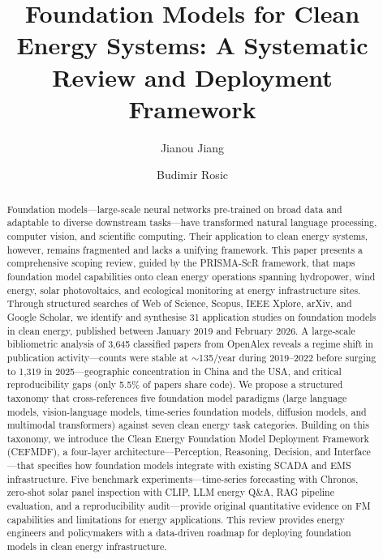 \documentclass[preprint,12pt]{elsarticle}
\begin{document}
\begin{frontmatter}
\title{Foundation Models for Clean Energy Systems: A Systematic Review and Deployment Framework}

\author[ox]{Jianou Jiang}
\author[ox2]{Budimir Rosic}



\begin{abstract}
Foundation models---large-scale neural networks pre-trained on broad data and adaptable to diverse downstream tasks---have transformed natural language processing, computer vision, and scientific computing. Their application to clean energy systems, however, remains fragmented and lacks a unifying framework. This paper presents a comprehensive scoping review, guided by the PRISMA-ScR framework, that maps foundation model capabilities onto clean energy operations spanning hydropower, wind energy, solar photovoltaics, and ecological monitoring at energy infrastructure sites. Through structured searches of Web of Science, Scopus, IEEE Xplore, arXiv, and Google Scholar, we identify and synthesise 31 application studies on foundation models in clean energy, published between January 2019 and February 2026. A large-scale bibliometric analysis of 3{,}645 classified papers from OpenAlex reveals a regime shift in publication activity---counts were stable at ${\sim}$135/year during 2019--2022 before surging to 1{,}319 in 2025---geographic concentration in China and the USA, and critical reproducibility gaps (only 5.5\% of papers share code). We propose a structured taxonomy that cross-references five foundation model paradigms (large language models, vision-language models, time-series foundation models, diffusion models, and multimodal transformers) against seven clean energy task categories. Building on this taxonomy, we introduce the Clean Energy Foundation Model Deployment Framework (CEFMDF), a four-layer architecture---Perception, Reasoning, Decision, and Interface---that specifies how foundation models integrate with existing SCADA and EMS infrastructure. Five benchmark experiments---time-series forecasting with Chronos, zero-shot solar panel inspection with CLIP, LLM energy Q\&A, RAG pipeline evaluation, and a reproducibility audit---provide original quantitative evidence on FM capabilities and limitations for energy applications. This review provides energy engineers and policymakers with a data-driven roadmap for deploying foundation models in clean energy infrastructure.
\end{abstract}


\end{frontmatter}
\end{document}

